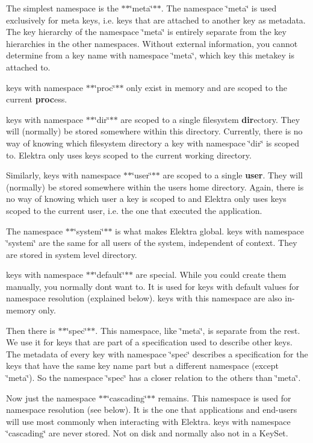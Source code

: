 \begin{DoxyItemize}
\item The simplest namespace is the $\ast$$\ast$\char`\"{}meta\char`\"{}$\ast$$\ast$. The namespace \char`\"{}meta\char`\"{} is used exclusively for meta keys, i.\+e. keys that are attached to another key as metadata. The key hierarchy of the namespace \char`\"{}meta\char`\"{} is entirely separate from the key hierarchies in the other namespaces. Without external information, you cannot determine from a key name with namespace \char`\"{}meta\char`\"{}, which key this metakey is attached to.
\item keys with namespace $\ast$$\ast$\char`\"{}proc\char`\"{}$\ast$$\ast$ only exist in memory and are scoped to the current {\bfseries proc}ess.
\item keys with namespace $\ast$$\ast$\char`\"{}dir\char`\"{}$\ast$$\ast$ are scoped to a single filesystem {\bfseries dir}ectory. They will (normally) be stored somewhere within this directory. Currently, there is no way of knowing which filesystem directory a key with namespace \char`\"{}dir\char`\"{} is scoped to. Elektra only uses keys scoped to the current working directory.
\item Similarly, keys with namespace $\ast$$\ast$\char`\"{}user\char`\"{}$\ast$$\ast$ are scoped to a single {\bfseries user}. They will (normally) be stored somewhere within the user\textquotesingle{}s home directory. Again, there is no way of knowing which user a key is scoped to and Elektra only uses keys scoped to the current user, i.\+e. the one that executed the application.
\item The namespace $\ast$$\ast$\char`\"{}system\char`\"{}$\ast$$\ast$ is what makes Elektra global. keys with namespace \char`\"{}system\char`\"{} are the same for all users of the system, independent of context. They are stored in system level directory.
\item keys with namespace $\ast$$\ast$\char`\"{}default\char`\"{}$\ast$$\ast$ are special. While you could create them manually, you normally don\textquotesingle{}t want to. It is used for keys with default values for namespace resolution (explained below). keys with this namespace are also in-\/memory only.
\item Then there is $\ast$$\ast$\char`\"{}spec\char`\"{}$\ast$$\ast$. This namespace, like \char`\"{}meta\char`\"{}, is separate from the rest. We use it for keys that are part of a specification used to describe other keys. The metadata of every key with namespace \char`\"{}spec\char`\"{} describes a specification for the keys that have the same key name part but a different namespace (except \char`\"{}meta\char`\"{}). So the namespace \char`\"{}spec\char`\"{} has a closer relation to the others than \char`\"{}meta\char`\"{}.
\item Now just the namespace $\ast$$\ast$\char`\"{}cascading\char`\"{}$\ast$$\ast$ remains. This namespace is used for namespace resolution (see below). It is the one that applications and end-\/users will use most commonly when interacting with Elektra. keys with namespace \char`\"{}cascading\char`\"{} are never stored. Not on disk and normally also not in a {\ttfamily Key\+Set}.
\end{DoxyItemize}

